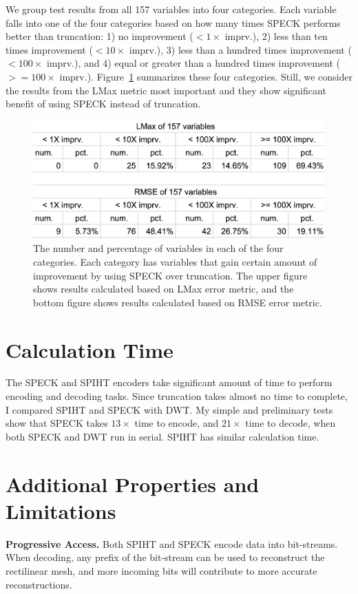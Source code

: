 \documentclass[review]{vgtc}                 %
\begin{document}
We group test results from all 157 variables into four categories.
%
Each variable falls into one of the four categories 
based on how many times SPECK performs better than truncation:
1) no improvement ($< 1\times$ imprv.),
2) less than ten times improvement ($< 10\times$ imprv.),
3) less than a hundred times improvement ($< 100\times$ imprv.), 
and 4) equal or greater than a hundred times improvement
($>= 100 \times$ imprv.).
%
Figure~\ref{fig:histogram} summarizes these four categories.
%
Still, we consider the results from the LMax metric most important
and they show significant benefit of using SPECK instead of truncation.

\begin{figure}
  \centering
    \includegraphics[width=1\columnwidth]{figs/histogram.png}
  \caption{
The number and percentage of variables in each of the four categories.
%
Each category has variables that gain certain amount of improvement by
using SPECK over truncation.
%
The upper figure shows results calculated based on LMax error metric,
and the bottom figure shows results calculated based on RMSE error metric.
}
  \label{fig:histogram}
\end{figure}


\section{Calculation Time}
%
The SPECK and SPIHT encoders take significant amount of time to perform
encoding and decoding tasks. 
%
Since truncation takes almost no time to complete, I compared
SPIHT and SPECK with DWT.
%
My simple and preliminary tests show that SPECK takes $13\times$ time to encode,
and $21\times$ time to decode, when both SPECK and DWT run in serial.
%
SPIHT has similar calculation time.


\section{Additional Properties and Limitations}
%
\textbf{Progressive Access.}
%
Both SPIHT and SPECK encode data into bit-streams. 
%
When decoding, any prefix of the bit-stream can be used to reconstruct
the rectilinear mesh, and more incoming bits will contribute to 
more accurate reconstructions.
\end{document}
